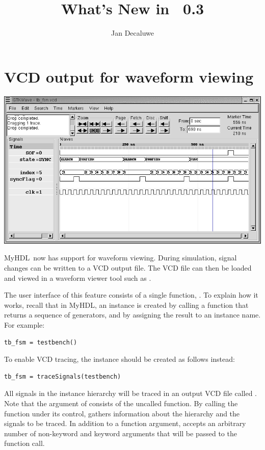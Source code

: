 \documentclass{howto}
\title{What's New in \myhdl\ 0.3}
\author{Jan Decaluwe}
\newcommand{\myhdl}{\protect \mbox{MyHDL}}
\begin{document}
\maketitle
\tableofcontents


\section{VCD output for waveform viewing\label{section-wave}}

\ifpdf
\includegraphics{tbfsm.png}
\fi

\myhdl\ now has support for waveform viewing. During simulation, signal
changes can be written to a VCD output file.  The VCD file can then be
loaded and viewed in a waveform viewer tool such as .

The user interface of this feature consists of a single function,
.  To explain how it works, recall that in
\myhdl{}, an instance is created by calling a function that returns a
sequence of generators, and by assigning the result to an instance
name. For example:

\begin{verbatim}
tb_fsm = testbench()
\end{verbatim}

To enable VCD tracing, the instance should be created as follows
instead:

\begin{verbatim}
tb_fsm = traceSignals(testbench)
\end{verbatim}

All signals in the instance hierarchy will be traced in
an output VCD file called . Note that the argument of
 consists of the uncalled function. By calling
the function under its control,  gathers
information about the hierarchy and the signals to be traced.  In
addition to a function argument,  accepts an
arbitrary number of non-keyword and keyword arguments that will be
passed to the function call.
\end{document}
